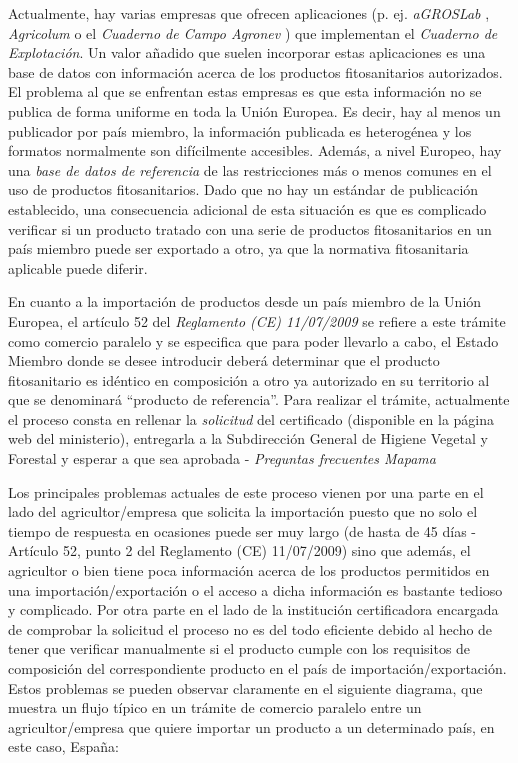 Actualmente, hay varias empresas que ofrecen aplicaciones (p. ej. \textit{aGROSLab} \cite{agroslab}, \textit{Agricolum} \cite{agricolum} o el \textit{Cuaderno de Campo Agronev} \cite{agronev}) que implementan el \textit{Cuaderno de Explotación}. Un valor añadido que suelen incorporar estas aplicaciones es una base de datos con información acerca de los productos fitosanitarios autorizados. El problema al que se enfrentan estas empresas es que esta información no se publica de forma uniforme en toda la Unión Europea. Es decir, hay al menos un publicador por país miembro, la información publicada es heterogénea y los formatos normalmente son difícilmente accesibles. Además, a nivel Europeo, hay una \textit{base de datos de referencia} \cite{pesticidesdb} de las restricciones más o menos comunes en el uso de productos fitosanitarios. Dado que no hay un estándar de publicación establecido, una consecuencia adicional de esta situación es que es complicado verificar si un producto tratado con una serie de productos fitosanitarios en un país miembro puede ser exportado a otro, ya que la normativa fitosanitaria aplicable puede diferir.\par
En cuanto a la importación de productos desde un país miembro de la Unión Europea, el artículo 52 del \textit{Reglamento (CE) 11/07/2009} \cite{reglamento} se refiere a este trámite como comercio paralelo y se especifica que para poder llevarlo a cabo, el Estado Miembro donde se desee introducir deberá determinar que el producto fitosanitario es idéntico en composición a otro ya autorizado en su territorio al que se denominará “producto de referencia”. Para realizar el trámite, actualmente el proceso consta en rellenar la \textit{solicitud} del \gls{certificado} \cite{solicitud} (disponible en la página web del ministerio), entregarla a la Subdirección General de Higiene Vegetal y Forestal y esperar a que sea aprobada - \textit{Preguntas frecuentes Mapama} \cite{faqmapama} \par
Los principales problemas actuales de este proceso vienen por una parte en el lado del agricultor/empresa que solicita la importación puesto que no solo el tiempo de respuesta en ocasiones puede ser muy largo (de hasta de 45 días - Artículo 52, punto 2 del Reglamento (CE) 11/07/2009) sino que además, el agricultor o bien tiene poca información acerca de los productos permitidos en una importación/exportación o el acceso a dicha información es bastante tedioso y complicado. Por otra parte en el lado de la institución certificadora encargada de comprobar la solicitud el proceso no es del todo eficiente debido al hecho de tener que verificar manualmente si el producto cumple con los requisitos de composición del correspondiente producto en el país de importación/exportación. Estos problemas se pueden observar claramente en el siguiente diagrama, que muestra un flujo típico en un trámite de comercio paralelo entre un agricultor/empresa que quiere importar un producto a un determinado país, en este caso, España: 

